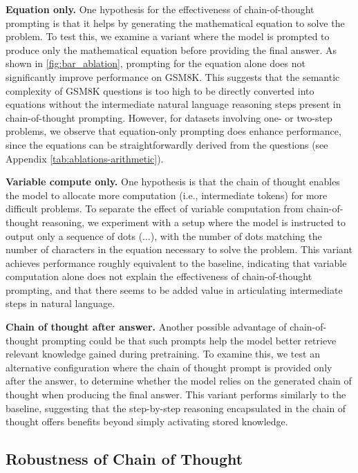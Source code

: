 \textbf{Equation only.} One hypothesis for the effectiveness of chain-of-thought prompting is that it helps by generating the mathematical equation to solve the problem. To test this, we examine a variant where the model is prompted to produce only the mathematical equation before providing the final answer. As shown in \cref{fig:bar_ablation}, prompting for the equation alone does not significantly improve performance on GSM8K. This suggests that the semantic complexity of GSM8K questions is too high to be directly converted into equations without the intermediate natural language reasoning steps present in chain-of-thought prompting. However, for datasets involving one- or two-step problems, we observe that equation-only prompting does enhance performance, since the equations can be straightforwardly derived from the questions (see Appendix \cref{tab:ablations-arithmetic}).


\textbf{Variable compute only.} One hypothesis is that the chain of thought enables the model to allocate more computation (i.e., intermediate tokens) for more difficult problems. To separate the effect of variable computation from chain-of-thought reasoning, we experiment with a setup where the model is instructed to output only a sequence of dots ($\ldots$), with the number of dots matching the number of characters in the equation necessary to solve the problem. This variant achieves performance roughly equivalent to the baseline, indicating that variable computation alone does not explain the effectiveness of chain-of-thought prompting, and that there seems to be added value in articulating intermediate steps in natural language.

\textbf{Chain of thought after answer.} Another possible advantage of chain-of-thought prompting could be that such prompts help the model better retrieve relevant knowledge gained during pretraining. To examine this, we test an alternative configuration where the chain of thought prompt is provided only after the answer, to determine whether the model relies on the generated chain of thought when producing the final answer. This variant performs similarly to the baseline, suggesting that the step-by-step reasoning encapsulated in the chain of thought offers benefits beyond simply activating stored knowledge.


\subsection{Robustness of Chain of Thought}\label{subsec:robustness}

